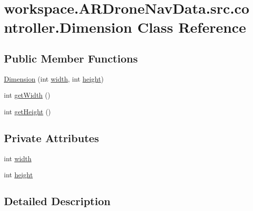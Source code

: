 \hypertarget{classworkspace_1_1_a_r_drone_nav_data_1_1src_1_1controller_1_1_dimension}{}\section{workspace.\+A\+R\+Drone\+Nav\+Data.\+src.\+controller.\+Dimension Class Reference}
\label{classworkspace_1_1_a_r_drone_nav_data_1_1src_1_1controller_1_1_dimension}
\subsection*{Public Member Functions}
\begin{DoxyCompactItemize}
\item 
\hyperlink{classworkspace_1_1_a_r_drone_nav_data_1_1src_1_1controller_1_1_dimension_ad6acfc6e5b360a547a9b7a9a89191e16}{Dimension} (int \hyperlink{classworkspace_1_1_a_r_drone_nav_data_1_1src_1_1controller_1_1_dimension_ab9ac1821926d7b93ed9601e81e5fdd79}{width}, int \hyperlink{classworkspace_1_1_a_r_drone_nav_data_1_1src_1_1controller_1_1_dimension_ae9213b87835a35e1f34faecf223ad85f}{height})
\item 
int \hyperlink{classworkspace_1_1_a_r_drone_nav_data_1_1src_1_1controller_1_1_dimension_a15b0ceb57a234af86a111fe11c17e33f}{get\+Width} ()
\item 
int \hyperlink{classworkspace_1_1_a_r_drone_nav_data_1_1src_1_1controller_1_1_dimension_a5bd83cb0848db0e4a31c58487e6d7cbf}{get\+Height} ()
\end{DoxyCompactItemize}
\subsection*{Private Attributes}
\begin{DoxyCompactItemize}
\item 
int \hyperlink{classworkspace_1_1_a_r_drone_nav_data_1_1src_1_1controller_1_1_dimension_ab9ac1821926d7b93ed9601e81e5fdd79}{width}
\item 
int \hyperlink{classworkspace_1_1_a_r_drone_nav_data_1_1src_1_1controller_1_1_dimension_ae9213b87835a35e1f34faecf223ad85f}{height}
\end{DoxyCompactItemize}


\subsection{Detailed Description}


